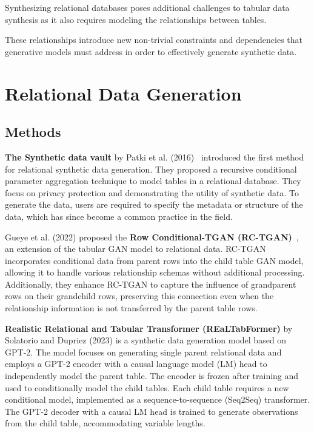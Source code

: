 \documentclass[fleqn,moreauthors,10pt]{ds_report}
\begin{document}
Synthesizing relational databases poses additional challenges to tabular data synthesis as it also requires modeling the relationships between tables. 

These relationships introduce new non-trivial constraints and dependencies that generative models must address in order to effectively generate synthetic data.

\section{Relational Data Generation} \label{sec:relational}
 \subsection{Methods}

\textbf{The Synthetic data vault} by Patki et al. (2016)~\cite{SDV} introduced the first method for relational synthetic data generation. They proposed a recursive conditional parameter aggregation technique to model tables in a relational database. They focus on privacy protection and demonstrating the utility of synthetic data. To generate the data, users are required to specify the metadata or structure of the data, which has since become a common practice in the field.

Gueye et al. (2022) proposed the \textbf{Row Conditional-TGAN (RC-TGAN)}~\cite{RC-TGAN}, an extension of the tabular GAN model to relational data. RC-TGAN incorporates conditional data from parent rows into the child table GAN model, allowing it to handle various relationship schemas without additional processing. Additionally, they enhance RC-TGAN to capture the influence of grandparent rows on their grandchild rows, preserving this connection even when the relationship information is not transferred by the parent table rows.

 \textbf{Realistic Relational and Tabular Transformer (REaLTabFormer)} by Solatorio and Dupriez (2023) \cite{solatorio2023realtabformer} is a synthetic data generation model based on GPT-2. The model focuses on generating single parent relational data and employs a GPT-2 encoder with a causal language model (LM) head to independently model the parent table. The encoder is frozen after training and used to conditionally model the child tables. Each child table requires a new conditional model, implemented as a sequence-to-sequence (Seq2Seq) transformer. The GPT-2 decoder with a causal LM head is trained to generate observations from the child table, accommodating variable lengths.
\end{document}
